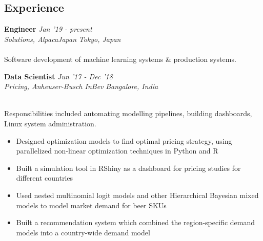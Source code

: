 \documentclass[margin]{res}
\begin{document}
 
 

\address
{ 
    \href{mailto:saubhik.mukherjee@gmail.com}{e-mail} | 
    \href{https://github.com/saubhik/}{github} | 
    \href{https://www.linkedin.com/in/saubhikm/}{linkedin} \\
    \textbf{phone}: +81 070 1594 0101 \\
    \textbf{date of birth}: 15 June 1993
}
 
\begin{resume}




\section{Experience}


\textbf{Engineer} \hfill \textit{Jan '19 - present}\\
\textit{Solutions, AlpacaJapan} \hfill \textit{Tokyo, Japan}\\
\\
{\small
    Software development of machine learning systems \& production systems.
}

\textbf{Data Scientist} \hfill \textit{Jun '17 - Dec '18}\\
\textit{Pricing, Anheuser-Busch InBev} \hfill \textit{Bangalore, India}\\
\\
{\small 
    Responsibilities included automating modelling pipelines, building dashboards, Linux system administration.
    \begin{itemize} \itemsep -2pt
    \item Designed optimization models to find optimal pricing strategy, using parallelized non-linear optimization techniques in Python and R
    \item Built a simulation tool in RShiny as a dashboard for pricing studies for different countries
    \item Used nested multinomial logit models and other Hierarchical Bayesian mixed models to model market demand for beer SKUs
    \item Built a recommendation system which combined the region-specific demand models into a country-wide demand model
    \end{itemize}
}





\end{resume}
\end{document}
